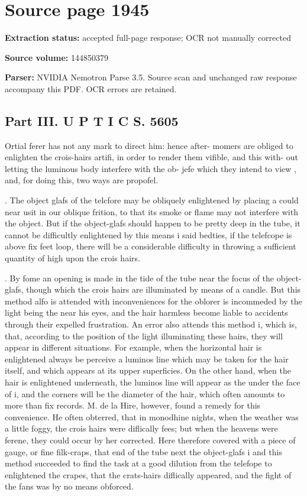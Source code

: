 \clearpage
\section{Source page 1945}
\textbf{Extraction status:} accepted full-page response; OCR not manually corrected\par
\textbf{Source volume:} 144850379\par
\textbf{Parser:} NVIDIA Nemotron Parse 3.5. Source scan and unchanged raw response accompany this PDF. OCR errors are retained.\par\medskip
\subsection*{Part III. U P T I C S. 5605}
Ortial ferer has not any mark to direct him: hence after- momers are obliged to enlighten the crois-hairs artifi, in order to render them vifible, and this with- out letting the luminous body interfere with the ob- jefe which they intend to view , and, for doing this, two ways are propofel.\par{}. The object glafs of the telcfore may be obliquely enlightened by placing a could near usit in our oblique frition, to that its smoke or flame may not interfere with the object. But if the object-glafs should happen to be pretty deep in the tube, it cannot be difficultly enlightened by this means i said bedties, if the telefcope is above fix feet loop, there will be a considerable difficulty in throwing a sufficient quantity of high upon the crois hairs.\par{}. By fome an opening is made in the tide of the tube near the focus of the object-glafs, though which the crois hairs are illuminated by means of a candle. But this method alfo is attended with inconveniences for the oblorer is incommeded by the light being the near his eyes, and the hair harmless become liable to accidents through their expelled frustration. An error also attends this method i, which is, that, according to the position of the light illuminating these hairs, they will appear in different situations. For example, when the horizontal hair is enlightened always be perceive a luminos line which may be taken for the hair itself, and which appears at its upper superficies. On the other hand, when the hair is enlightened underneath, the luminos line will appear as the under the face of i, and the corners will be the diameter of the hair, which often amounts to more than fix records. M. de la Hire, however, found a remedy for this convenience. He often obterred, that in monodhine nights, when the weather was a little foggy, the crois hairs were diflically fees; but when the heavens were ferene, they could occur by her corrected. Here therefore covered with a piece of gauge, or fine filk-craps, that end of the tube next the object-glafs i and this method succeeded to find the task at a good dilution from the telefope to enlightened the crapes, that the crats-hairs diflically appeared, and the fight of the fans was by no means obforced.\par\medskip
